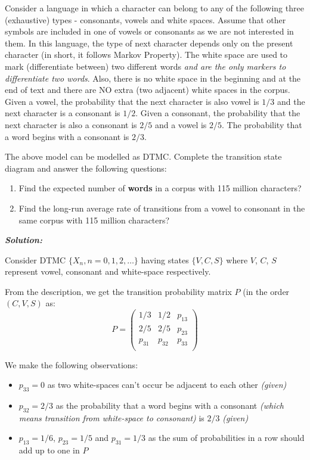 \documentclass[12pt, oneside]{article}
\begin{document}
\begin{enumerate}
Consider a language in which a character can belong to any of the following three (exhaustive) types - consonants, vowels and white spaces. Assume that other symbols are included in one of vowels or consonants as we are not interested in them. In this language, the type of next character depends only on the present character (in short, it follows Markov Property). The white space are used to mark (differentiate between) two different words \textit{and are the only markers to differentiate two words}. Also, there is no white space in the beginning and at the end of text and there are NO extra (two adjacent) white spaces in the corpus. Given a vowel, the probability that the next character is also vowel is $1/3$ and the next character is a consonant is $1/2$. Given a consonant, the probability that the next character is also a consonant is $2/5$ and a vowel is $2/5$. The probability that a word begins with a consonant is $2/3$. 

The above model can be modelled as DTMC. Complete the transition state diagram and answer the following questions:
\begin{enumerate}[label=(\alph*)]
\item Find the expected number of \textbf{words} in a corpus with 115 million characters?
\item Find the long-run average rate of transitions from a vowel to consonant in the same corpus with 115 million characters?

\end{enumerate}

\textbf{\textit{Solution:}}

Consider DTMC $\{ X_n, n=0,1,2,\dots \}$ having states $\{V,C,S\}$ where $V$, $C$, $S$ represent vowel, consonant and white-space respectively.

From the description, we get the transition probability matrix $P$ (in the order $(C,V,S)$ as:
\[ P = 
\begin{pmatrix}
1/3    & 1/2    & p_{13} \\
2/5    & 2/5    & p_{23} \\
p_{31} & p_{32} & p_{33} \\
\end{pmatrix}
\]

We make the following observations:
\begin{itemize}
    \item $p_{33} = 0$ as two white-spaces can't occur be adjacent to each other \textit{(given)}
    \item $p_{32} = 2/3$ as the probability that a word begins with a consonant \textit{(which means transition from white-space to consonant)} is $2/3$ \textit{(given)}
    \item $p_{13} = 1/6$, $p_{23} = 1/5$ and $p_{31} = 1/3$ as the sum of probabilities in a row should add up to one in $P$
\end{itemize}


\end{enumerate}
\end{document}
